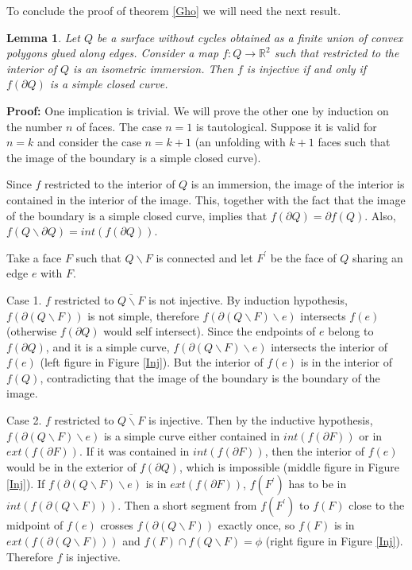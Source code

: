 \documentclass[openright, 12pt]{article}
\newtheorem{lema}[teorema]{Lemma}
\begin{document}
To conclude the proof of theorem \ref{Gho} we will need the next result.

\begin{lema}\label{Final}
{\rm Let $Q$ be a surface without cycles obtained as a finite union of convex polygons glued along edges. Consider a map $f: Q \rightarrow \mathbb{R}^2$ such that restricted to the interior of $Q$ is an isometric immersion. Then $f$ is injective if and only if $f(\partial Q)$ is a simple closed curve. 
}
\end{lema}

\textbf{Proof: }One implication is trivial. We will prove the other one by induction on the number $n$ of faces. The case $n=1$ is tautological. Suppose it is valid for $n=k$ and consider the case $n=k+1$ (an unfolding with $k+1$ faces such that the image of the boundary is a simple closed curve). 

Since $f $ restricted to the interior of $Q$ is an immersion, the image of the interior is contained in the interior of the image. This, together with the fact that the image of the boundary is a simple closed curve, implies that $f(\partial Q)  = \partial f(Q)$. Also, $f(Q \backslash \partial Q) = int (f(\partial Q) )$.


Take a face $F$ such that $Q \backslash F$ is connected and let $F^{\prime}$ be the face of $Q$ sharing an edge $e$ with $F$.

Case 1. $f$ restricted to $\overline{ Q\backslash F}$ is not injective. By induction hypothesis, $f(\partial (Q \backslash F))$ is not simple, therefore $f(\partial (Q \backslash F ) \backslash e) $ intersects $f(e)$ (otherwise $f(\partial Q)$ would self intersect). Since the endpoints of $e$ belong to $f(\partial Q)$, and it is a simple curve, $f(\partial (Q\backslash F) \backslash e)$ intersects the interior of $f(e)$ (left figure in Figure \ref{Inj}). But the interior of $f(e)$ is in the interior of $f(Q)$, contradicting that the image of the boundary is the boundary of the image.


Case 2. $f$ restricted to $\overline{ Q \backslash F }$ is injective. Then by the inductive hypothesis, $f(\partial (Q \backslash F) \backslash e)$ is a simple curve either contained in $int(f( \partial F)) $ or in $ext( f (\partial F))$. If it was contained in $int(f( \partial F)) $, then the interior of $f(e)$ would be in the exterior of $f(\partial Q)$, which is impossible (middle figure in Figure \ref{Inj}). If $f(\partial (Q \backslash F) \backslash e)$ is in $ext( f (\partial F))$, $f(F^{\prime})$ has to be in $int (f(\partial (Q \backslash F)))$. Then a short segment from $f(F^{\prime})$ to $f(F)$ close to the midpoint of $f(e)$ crosses $f(\partial (Q \backslash F))$ exactly once, so $f(F)$ is in $ext (f(\partial (Q \backslash F)))$ and $f(F) \cap f(Q \backslash F) = \phi$ (right figure in Figure \ref{Inj}). Therefore $f$ is injective.
\end{document}
